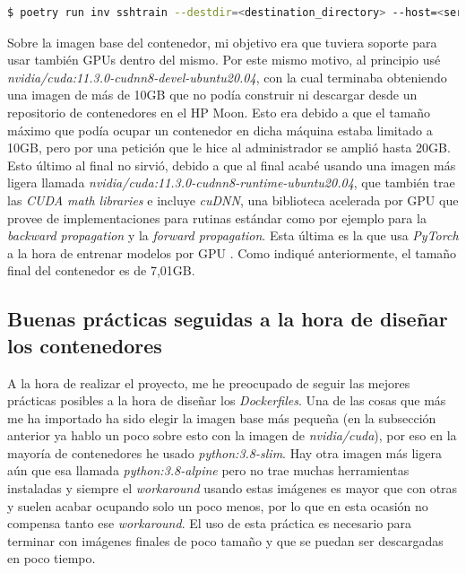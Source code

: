\begin{lstlisting}[language=bash]
$ poetry run inv sshtrain --destdir=<destination_directory> --host=<server_dir> [--gw=<gw_dir>].
\end{lstlisting}

Sobre la imagen base del contenedor, mi objetivo era que tuviera soporte para usar también GPUs dentro del mismo. Por este mismo motivo, al principio usé \textit{nvidia/cuda:11.3.0-cudnn8-devel-ubuntu20.04}, con la cual terminaba obteniendo una imagen de más de 10GB que no podía construir ni descargar desde un repositorio de contenedores en el HP Moon. Esto era debido a que el tamaño máximo que podía ocupar un contenedor en dicha máquina estaba limitado a 10GB, pero por una petición que le hice al administrador se amplió hasta 20GB. Esto último al final no sirvió, debido a que al final acabé usando una imagen más ligera llamada \textit{nvidia/cuda:11.3.0-cudnn8-runtime-ubuntu20.04}, que también trae las \textit{CUDA math libraries} e incluye \textit{cuDNN}, una biblioteca acelerada por GPU que provee de implementaciones para rutinas estándar como por ejemplo para la \textit{backward propagation} y la \textit{forward propagation}. Esta última es la que usa \textit{PyTorch} a la hora de entrenar modelos por GPU \cite{cudnn}. Como indiqué anteriormente, el tamaño final del contenedor es de 7,01GB.\\

\subsection{Buenas prácticas seguidas a la hora de diseñar los contenedores}\label{subsec:dockerpractices}

A la hora de realizar el proyecto, me he preocupado de seguir las mejores prácticas posibles a la hora de diseñar los \textit{Dockerfiles}. Una de las cosas que más me ha importado ha sido elegir la imagen base más pequeña \cite{dockerbestpracticesdev} (en la subsección anterior ya hablo un poco sobre esto con la imagen de \textit{nvidia/cuda}), por eso en la mayoría de contenedores he usado \textit{python:3.8-slim}. Hay otra imagen más ligera aún que esa llamada \textit{python:3.8-alpine} pero no trae muchas herramientas instaladas y siempre el \textit{workaround} usando estas imágenes es mayor que con otras y suelen acabar ocupando solo un poco menos, por lo que en esta ocasión no compensa tanto ese \textit{workaround}. El uso de esta práctica es necesario para terminar con imágenes finales de poco tamaño y que se puedan ser descargadas en poco tiempo.\newline

